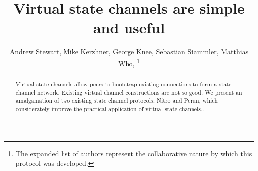 \documentclass{article}
\title{Virtual state channels are simple and useful}
\author{Andrew Stewart, Mike Kerzhner, George Knee, Sebastian Stammler, Matthias Who, \footnote{The expanded list of authors represent the collaborative nature by which this protocol was developed.}}
\begin{document}
\maketitle
\begin{abstract}
  Virtual state channels allow peers to bootstrap existing connections to form a state channel network. Existing virtual channel constructions are not so good. We present an amalgamation of two existing state channel protocols, Nitro and Perun, which considerately improve the practical application of virtual state channels..
\end{abstract} 









\end{document}
